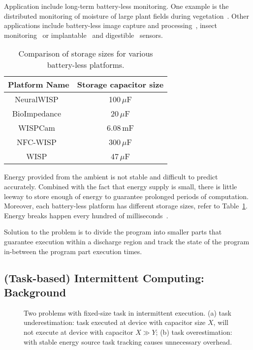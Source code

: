 Application include long-term battery-less monitoring. One example is the distributed monitoring of moisture of large plant fields during vegetation~\cite{}. Other applications include battery-less image capture and processing~\cite{naderiparizi_rfid_2015}, insect monitoring~\cite{thomas_jbcs_2012} or implantable~\cite{rodriguez_tbcs_2015}  and digestible~\cite{nadeau_naturebio_2017} sensors.

\begin{table}
	\begin{tabular}{|c|c|}
	\hline
	Platform Name & Storage capacitor size \\
	\hline \hline
	NeuralWISP~\cite{} & 100\,$\mu$F \\
	BioImpedance~\cite{} & 20\,$\mu$F \\
	WISPCam~\cite{} & 6.08\,mF \\ %
	NFC-WISP~\cite{zhao_rfid_2015} & 300\,$\mu$F \\
	WISP~\cite{} & 47\,$\mu$F \\
	\hline
	\end{tabular} 
\caption{Comparison of storage sizes for various battery-less platforms.}
\label{table:capacitor}
\end{table}


Energy provided from the ambient is not stable and difficult to predict accurately. Combined with the fact that energy supply is small, there is little leeway to store enough of energy to guarantee prolonged periods of computation. Moreover, each battery-less platform has different storage sizes, refer to Table~\ref{table:capacitor}. Energy breaks happen every hundred of milliseconds~\cite{soyata_csm_2016}.

Solution to the problem is to divide the program into smaller parts that guarantee execution within a discharge region and track the state of the program in-between the program part execution times.

\subsection{(Task-based) Intermittent Computing: Background}

\begin{figure}
	\centering
	\caption{Two problems with fixed-size task in intermittent execution. (a) task underestimation: task executed at device with capacitor size $X$, will not execute at device with capacitor $X\gg Y$; (b) task overestimation: with stable energy source task tracking causes unnecessary overhead.}
	\label{fig:fixed_task_problem}
\end{figure}

